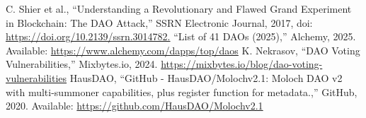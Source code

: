 \documentclass[conference]{IEEEtran}
\begin{document}
\begin{thebibliography}{00}
 C. Shier et al., “Understanding a Revolutionary and Flawed Grand Experiment in Blockchain: The DAO Attack,” SSRN Electronic Journal, 2017, doi: 
\url{https://doi.org/10.2139/ssrn.3014782.}
 “List of 41 DAOs (2025),” Alchemy, 2025. Available:
\url{https://www.alchemy.com/dapps/top/daos}
 K. Nekrasov, “DAO Voting Vulnerabilities,” Mixbytes.io, 2024.
\url{https://mixbytes.io/blog/dao-voting-vulnerabilities}
 HausDAO, “GitHub - HausDAO/Molochv2.1: Moloch DAO v2 with multi-summoner capabilities, plus register function for metadata.,” GitHub, 2020. Available:
\url{https://github.com/HausDAO/Molochv2.1}
\end{thebibliography}
\end{document}
